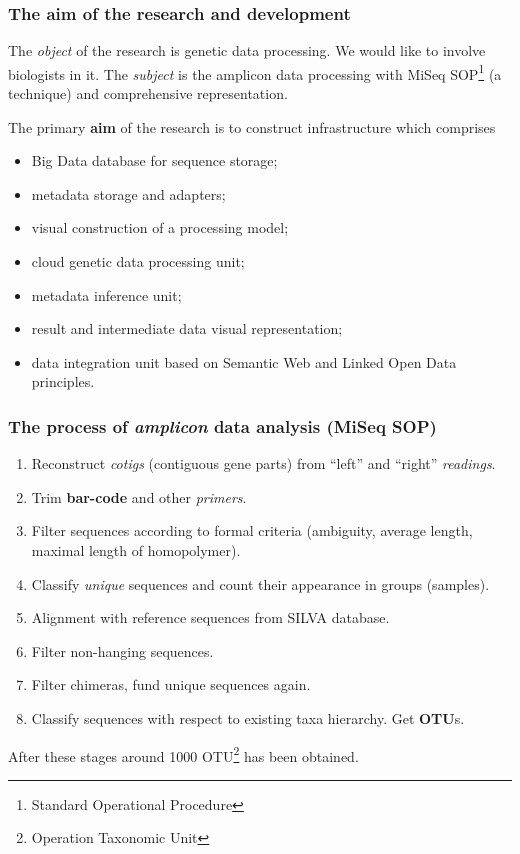 \documentclass[10pt]{beamer}
\begin{document}
\begin{frame}
  \frametitle{The aim of the research and development}

  The \emph{object} of the research is genetic data processing. We would like to involve biologists in it. The \emph{subject} is the amplicon data processing with MiSeq SOP\footnote{Standard Operational Procedure} (a technique) and comprehensive representation.

  The primary \textbf{aim} of the research is to construct infrastructure which comprises
  \begin{itemize}
  \item Big Data database for sequence storage;
  \item metadata storage and adapters;
  \item visual construction of a processing model;
  \item cloud genetic data processing unit;
  \item metadata inference unit;
  \item result and intermediate data visual representation;
  \item data integration unit based on Semantic Web and Linked Open Data principles.
  \end{itemize}

\end{frame}

\begin{frame}
  \frametitle{The process of \emph{amplicon} data analysis (MiSeq SOP)}
  \begin{enumerate}
  \item Reconstruct \emph{cotigs} (contiguous gene parts) from ``left'' and ``right'' \emph{readings}.
  \item Trim \textbf{bar-code} and other \emph{primers}.
  \item Filter sequences according to formal criteria (ambiguity, average length, maximal length of homopolymer).
  \item Classify \emph{unique} sequences and count their appearance in groups (samples).
  \item Alignment with reference sequences from SILVA database.
  \item Filter non-hanging sequences.
  \item Filter chimeras, fund unique sequences again.
  \item Classify sequences with respect to existing taxa hierarchy. Get \textbf{OTU}s.
  \end{enumerate}

  After these stages around 1000 OTU\footnote{Operation Taxonomic Unit} has been obtained.

\end{frame}
\end{document}
